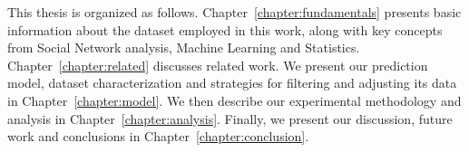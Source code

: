 This thesis is organized as follows. Chapter~\ref{chapter:fundamentals}
presents basic information about the dataset employed in this work, along with
key concepts from Social Network analysis, Machine Learning and Statistics.
Chapter~\ref{chapter:related} discusses related work. We present our prediction
model, dataset characterization and strategies for filtering and adjusting its
data in Chapter~\ref{chapter:model}. We then describe our experimental
methodology and analysis in Chapter~\ref{chapter:analysis}. Finally, we present
our discussion, future work and conclusions in
Chapter~\ref{chapter:conclusion}.
